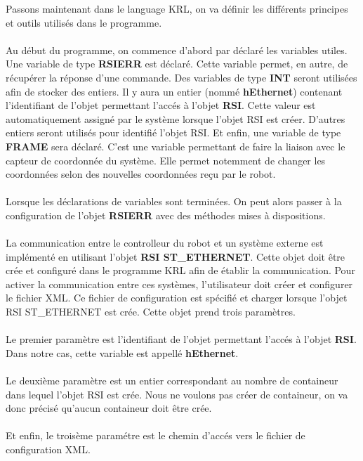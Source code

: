 Passons maintenant dans le language KRL, on va définir les différents principes et outils utilisés dans le programme.
\\
\\
Au début du programme, on commence d'abord par déclaré les variables utiles.
Une variable de type \textbf{RSIERR} est déclaré.
Cette variable permet, en autre, de récupérer la réponse d'une commande.
Des variables de type \textbf{INT} seront utilisées afin de stocker des entiers.
Il y aura un entier (nommé \textbf{hEthernet}) contenant l'identifiant de l'objet permettant l'accés à l'objet \textbf{RSI}.
Cette valeur est automatiquement assigné par le système lorsque l'objet RSI est créer.
D'autres entiers seront utilisés pour identifié l'objet RSI.
Et enfin, une variable de type \textbf{FRAME} sera déclaré.
C'est une variable permettant de faire la liaison avec le capteur de coordonnée du système.
Elle permet notemment de changer les coordonnées selon des nouvelles coordonnées reçu par le robot.
\\
\\
Lorsque les déclarations de variables sont terminées.
On peut alors passer à la configuration de l'objet \textbf{RSIERR} avec des méthodes mises à dispositions.
\\
\\
La communication entre le controlleur du robot et un système externe est implémenté en utilisant l'objet \textbf{RSI ST\_ETHERNET}.
Cette objet doit être crée et configuré dans le programme KRL afin de établir la communication.
Pour activer la communication entre ces systèmes, l'utilisateur doit créer et configurer le fichier XML.
Ce fichier de configuration est spécifié et charger lorsque l'objet RSI ST\_ETHERNET est crée.
Cette objet prend trois paramètres.
\\
\\
Le premier paramètre est l'identifiant de l'objet permettant l'accés à l'objet \textbf{RSI}.
Dans notre cas, cette variable est appellé \textbf{hEthernet}.
\\
\\
Le deuxième paramètre est un entier correspondant au nombre de containeur dans lequel l'objet RSI est crée.
Nous ne voulons pas créer de containeur, on va donc précisé qu'aucun containeur doit être crée.
\\
\\
Et enfin, le troisème paramétre est le chemin d'accés vers le fichier de configuration XML. 
\\
\\
